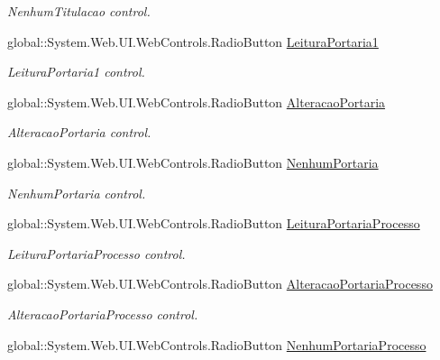 \begin{DoxyCompactItemize}
\begin{DoxyCompactList}\small\item\em NenhumTitulacao control. \item\end{DoxyCompactList}\item 
global::System.Web.UI.WebControls.RadioButton \hyperlink{class_sistema_r_h_1_1_cadastro_user_acbcd6b0df4328d0be4d9b71f8151a4f2}{LeituraPortaria1}
\begin{DoxyCompactList}\small\item\em LeituraPortaria1 control. \item\end{DoxyCompactList}\item 
global::System.Web.UI.WebControls.RadioButton \hyperlink{class_sistema_r_h_1_1_cadastro_user_a2095d4e90a9bedd977437adbac8c3c08}{AlteracaoPortaria}
\begin{DoxyCompactList}\small\item\em AlteracaoPortaria control. \item\end{DoxyCompactList}\item 
global::System.Web.UI.WebControls.RadioButton \hyperlink{class_sistema_r_h_1_1_cadastro_user_a0de4c38e7297ba6b7ce80aef864562d5}{NenhumPortaria}
\begin{DoxyCompactList}\small\item\em NenhumPortaria control. \item\end{DoxyCompactList}\item 
global::System.Web.UI.WebControls.RadioButton \hyperlink{class_sistema_r_h_1_1_cadastro_user_abaf30d02ff01cd234cd2c48a2465c48c}{LeituraPortariaProcesso}
\begin{DoxyCompactList}\small\item\em LeituraPortariaProcesso control. \item\end{DoxyCompactList}\item 
global::System.Web.UI.WebControls.RadioButton \hyperlink{class_sistema_r_h_1_1_cadastro_user_add7a4033b512309e1db5f806a68d2c9a}{AlteracaoPortariaProcesso}
\begin{DoxyCompactList}\small\item\em AlteracaoPortariaProcesso control. \item\end{DoxyCompactList}\item 
global::System.Web.UI.WebControls.RadioButton \hyperlink{class_sistema_r_h_1_1_cadastro_user_a4b42684da57180266ab3af8489391f8c}{NenhumPortariaProcesso}

\end{DoxyCompactItemize}
